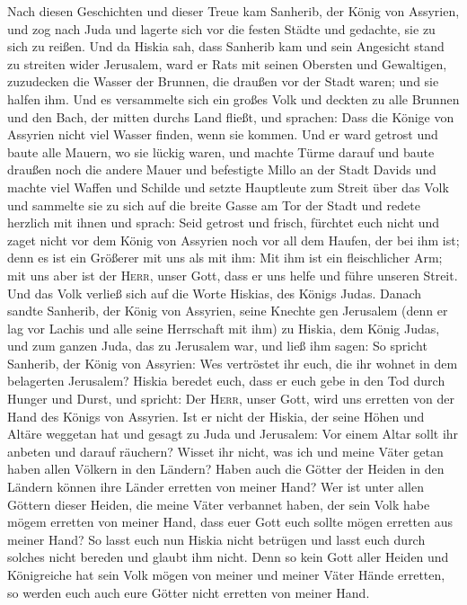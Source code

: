  Nach diesen Geschichten und dieser Treue kam Sanherib,
der König von Assyrien, und zog nach Juda und lagerte sich vor die
festen Städte und gedachte, sie zu sich zu reißen.  Und da
Hiskia sah, dass Sanherib kam und sein Angesicht stand zu streiten wider
Jerusalem,  ward er Rats mit seinen Obersten und
Gewaltigen, zuzudecken die Wasser der Brunnen, die draußen vor der Stadt
waren; und sie halfen ihm.  Und es versammelte sich ein
großes Volk und deckten zu alle Brunnen und den Bach, der mitten durchs
Land fließt, und sprachen: Dass die Könige von Assyrien nicht viel
Wasser finden, wenn sie kommen.  Und er ward getrost und
baute alle Mauern, wo sie lückig waren, und machte Türme darauf und
baute draußen noch die andere Mauer und befestigte Millo an der Stadt
Davids und machte viel Waffen und Schilde  und setzte
Hauptleute zum Streit über das Volk und sammelte sie zu sich auf die
breite Gasse am Tor der Stadt und redete herzlich mit ihnen und sprach:
 Seid getrost und frisch, fürchtet euch nicht und zaget
nicht vor dem König von Assyrien noch vor all dem Haufen, der bei ihm
ist; denn es ist ein Größerer mit uns als mit ihm:  Mit
ihm ist ein fleischlicher Arm; mit uns aber ist der \textsc{Herr}, unser
Gott, dass er uns helfe und führe unseren Streit. Und das Volk verließ
sich auf die Worte Hiskias, des Königs Judas.  Danach
sandte Sanherib, der König von Assyrien, seine Knechte gen Jerusalem
(denn er lag vor Lachis und alle seine Herrschaft mit ihm) zu Hiskia,
dem König Judas, und zum ganzen Juda, das zu Jerusalem war, und ließ ihm
sagen:  So spricht Sanherib, der König von Assyrien: Wes
vertröstet ihr euch, die ihr wohnet in dem belagerten Jerusalem?
 Hiskia beredet euch, dass er euch gebe in den Tod durch
Hunger und Durst, und spricht: Der \textsc{Herr}, unser Gott, wird uns
erretten von der Hand des Königs von Assyrien.  Ist er
nicht der Hiskia, der seine Höhen und Altäre weggetan hat und gesagt zu
Juda und Jerusalem: Vor einem Altar sollt ihr anbeten und darauf
räuchern?  Wisset ihr nicht, was ich und meine Väter
getan haben allen Völkern in den Ländern? Haben auch die Götter der
Heiden in den Ländern können ihre Länder erretten von meiner Hand?
 Wer ist unter allen Göttern dieser Heiden, die meine
Väter verbannet haben, der sein Volk habe mögem erretten von meiner
Hand, dass euer Gott euch sollte mögen erretten aus meiner Hand?
 So lasst euch nun Hiskia nicht betrügen und lasst euch
durch solches nicht bereden und glaubt ihm nicht. Denn so kein Gott
aller Heiden und Königreiche hat sein Volk mögen von meiner und meiner
Väter Hände erretten, so werden euch auch eure Götter nicht erretten von
meiner Hand.

